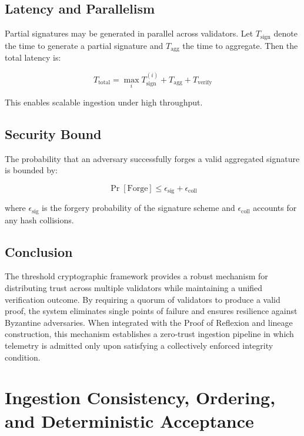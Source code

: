 \subsection{Latency and Parallelism}

Partial signatures may be generated in parallel across validators. Let $T_{\text{sign}}$ denote the time to generate a partial signature and $T_{\text{agg}}$ the time to aggregate. Then the total latency is:

\begin{equation}
T_{\text{total}} = \max_i T_{\text{sign}}^{(i)} + T_{\text{agg}} + T_{\text{verify}}
\end{equation}

This enables scalable ingestion under high throughput.

\subsection{Security Bound}

The probability that an adversary successfully forges a valid aggregated signature is bounded by:

\begin{equation}
\Pr[\text{Forge}] \leq \epsilon_{\text{sig}} + \epsilon_{\text{coll}}
\end{equation}

where $\epsilon_{\text{sig}}$ is the forgery probability of the signature scheme and $\epsilon_{\text{coll}}$ accounts for any hash collisions.

\subsection{Conclusion}

The threshold cryptographic framework provides a robust mechanism for distributing trust across multiple validators while maintaining a unified verification outcome. By requiring a quorum of validators to produce a valid proof, the system eliminates single points of failure and ensures resilience against Byzantine adversaries. When integrated with the Proof of Reflexion and lineage construction, this mechanism establishes a zero-trust ingestion pipeline in which telemetry is admitted only upon satisfying a collectively enforced integrity condition.

\section{Ingestion Consistency, Ordering, and Deterministic Acceptance}

